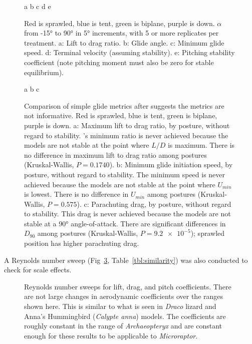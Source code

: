 \begin{figure}
a %
b %
c %
d %
e %
\caption{ Red is sprawled, blue is tent, green is biplane, purple is down. $\alpha$ from \ang{-15} to \ang{90} in \ang{5} increments, with 5 or more replicates per treatment. a: Lift to drag ratio. b: Glide angle. c: Minimum glide speed. d: Terminal velocity (assuming stability). e: Pitching stability coefficient (note pitching moment must also be zero for stable equilibrium).}
\label{fig:EKcomparisons1}
\end{figure}
\begin{figure}
a %
b %
c %
\caption{%
{ Comparison of simple glide metrics after \citep{Emerson:1990b} suggests the metrics are not informative.}
Red is sprawled, blue is tent, green is biplane, purple is down.%
a:  Maximum lift to drag ratio, by posture, without regard to stability.  \citep{Emerson:1990b}'s minimum ratio is never achieved because the models are not stable at the point where $L/D$ is maximum.  There is no difference in maximum lift to drag ratio among postures (Kruskal-Wallis, $P=0.1740$). b: Minimum glide initiation speed, by posture, without regard to stability. The minimum speed is never achieved because the models are not stable at the point where $U_{min}$ is lowest.  There is no difference in $U_{min}$ among postures (Kruskal-Wallis, $P=0.575$).  c:  Parachuting drag, by posture, without regard to stability. This drag is never achieved because the models are not stable at a \ang{90} angle-of-attack.  There are significant differences in $D_{90}$ among postures (Kruskal-Wallis, $P=\num{9.2e-5}$); sprawled position has higher parachuting drag.}
\label{fig:EKcomparisons2}
\end{figure}
A Reynolds number sweep (Fig~\ref{fig:Reynoldsnothing}, Table~\ref{tbl:similarity}) was also conducted to check for scale effects. 
\begin{figure}
\caption{Reynolds number sweeps for lift, drag, and pitch coefficients. There are not large changes in aerodynamic coefficients over the ranges shown here.  This is similar to what is seen in \emph{Draco} lizard and Anna's Hummingbird (\emph{Calypte anna}) models. The coefficients are roughly constant in the range of \emph{\dag Archaeopteryx} and are constant enough for these results to be applicable to \emph{\dag Microraptor}.}
\label{fig:Reynoldsnothing}
\end{figure}
%

